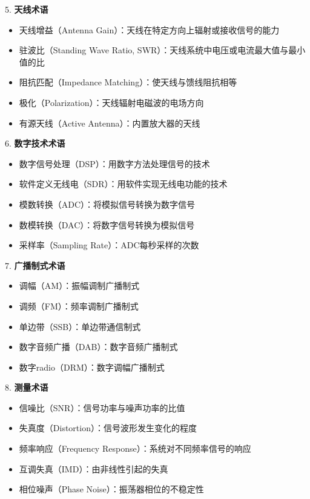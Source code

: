 \documentclass[12pt,UTF8]{ctexbook}
\begin{document}
5. \textbf{天线术语}
   \begin{itemize}[leftmargin=3.5em]
   \item 天线增益（Antenna Gain）：天线在特定方向上辐射或接收信号的能力
   \item 驻波比（Standing Wave Ratio, SWR）：天线系统中电压或电流最大值与最小值的比
   \item 阻抗匹配（Impedance Matching）：使天线与馈线阻抗相等
   \item 极化（Polarization）：天线辐射电磁波的电场方向
   \item 有源天线（Active Antenna）：内置放大器的天线
   \end{itemize}

6. \textbf{数字技术术语}
   \begin{itemize}[leftmargin=3.5em]
   \item 数字信号处理（DSP）：用数字方法处理信号的技术
   \item 软件定义无线电（SDR）：用软件实现无线电功能的技术
   \item 模数转换（ADC）：将模拟信号转换为数字信号
   \item 数模转换（DAC）：将数字信号转换为模拟信号
   \item 采样率（Sampling Rate）：ADC每秒采样的次数
   \end{itemize}

7. \textbf{广播制式术语}
   \begin{itemize}[leftmargin=3.5em]
   \item 调幅（AM）：振幅调制广播制式
   \item 调频（FM）：频率调制广播制式
   \item 单边带（SSB）：单边带通信制式
   \item 数字音频广播（DAB）：数字音频广播制式
   \item 数字radio（DRM）：数字调幅广播制式
   \end{itemize}

8. \textbf{测量术语}
   \begin{itemize}[leftmargin=3.5em]
   \item 信噪比（SNR）：信号功率与噪声功率的比值
   \item 失真度（Distortion）：信号波形发生变化的程度
   \item 频率响应（Frequency Response）：系统对不同频率信号的响应
   \item 互调失真（IMD）：由非线性引起的失真
   \item 相位噪声（Phase Noise）：振荡器相位的不稳定性
   \end{itemize}
\end{document}

